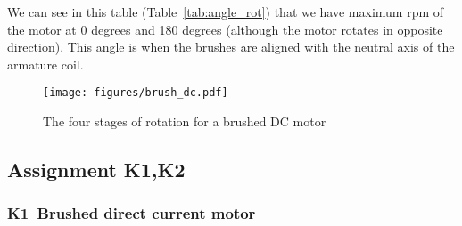 \documentclass[12pt,a4paper]{report}
\begin{document}
We can see in this table (Table~\ref{tab:angle_rot}) that we have maximum rpm of the motor at 0 degrees and 180 degrees (although the motor rotates in opposite direction). This angle is when the brushes are aligned with the neutral axis of the armature coil. \\

\begin{figure}[ht]
	\centering
	\texttt{[image: figures/brush\_dc.pdf]}
	\caption{The four stages of rotation for a brushed DC motor}
	\label{fig:brush_dc}
\end{figure}

\subsection{Assignment K1,K2}
\subsubsection{K1\ Brushed direct current motor}
\end{document}

